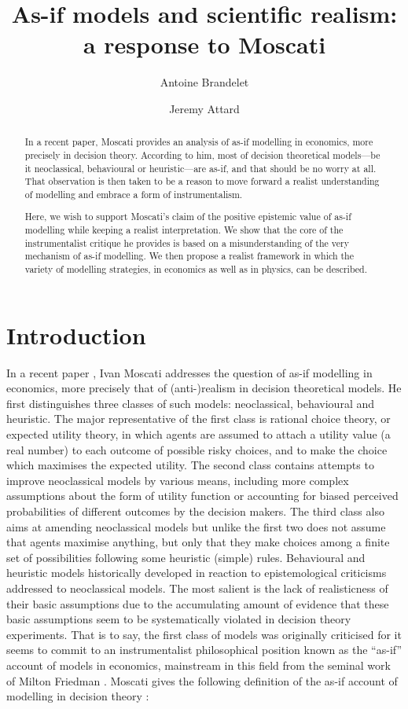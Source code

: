 \documentclass[a4paper,11pt]{article}
\title{As-if models and scientific realism: a response to Moscati}
\date{}
\author[1]{Antoine Brandelet}
\author[1,2]{Jeremy Attard}
\affil[1]{Department of Philosophy and History of Science, University of Mons, Belgium}
\affil[2]{Department of Sciences, Philosophies and Societies, University of Namur, Belgium}
\theoremstyle{definition}
\begin{document}
\maketitle



\begin{abstract}
    In a recent paper, Moscati provides an analysis of as-if modelling in economics, more precisely in decision theory. According to him, most of decision theoretical models---be it neoclassical, behavioural or heuristic---are as-if, and that should be no worry at all. That observation is then taken to be a reason to move forward a realist understanding of modelling and embrace a form of instrumentalism.

    Here, we wish to support Moscati's claim of the positive epistemic value of as-if modelling while keeping a realist interpretation. We show that the core of the instrumentalist critique he provides is based on a misunderstanding of the very mechanism of as-if modelling. We then propose a realist framework in which the variety of modelling strategies, in economics as well as in physics, can be described.
\end{abstract}


\section{Introduction}

In a recent paper \citep{Moscati2023}, Ivan Moscati addresses the question of as-if modelling in economics, more precisely that of (anti-)realism in decision theoretical models. He first distinguishes three classes of such models: neoclassical, behavioural and heuristic. The major representative of the first class is rational choice theory, or expected utility theory, in which agents are assumed to attach a utility value (a real number) to each outcome of possible risky choices, and to make the choice which maximises the expected utility. The second class contains attempts to improve neoclassical models by various means, including more complex assumptions about the form of utility function or accounting for biased perceived probabilities of different outcomes by the decision makers. The third class also aims at amending neoclassical models but unlike the first two does not assume that agents maximise anything, but only that they make choices among a finite set of possibilities following some heuristic (simple) rules. Behavioural and heuristic models historically developed in reaction to epistemological criticisms addressed to neoclassical models. The most salient is the lack of realisticness of their basic assumptions due to the accumulating amount of evidence that these basic assumptions seem to be systematically violated in decision theory experiments. That is to say, the first class of models was originally criticised for it seems to commit to an instrumentalist philosophical position known as the ``as-if'' account of models in economics, mainstream in this field from the seminal work of Milton Friedman \cite{Friedman1953}. Moscati gives the following definition of the as-if account of modelling in decision theory \citep[p. 2]{Moscati2023}: 
\end{document}
